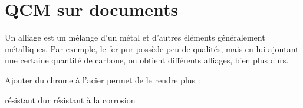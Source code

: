 \section{QCM sur documents}

Un alliage est un mélange d'un métal et d'autres éléments généralement métalliques. Par exemple, le fer pur possède peu de qualités, mais en lui ajoutant une certaine quantité de carbone, on obtient différents alliages, bien plus durs.

\begin{questions}
	\question[] Ajouter du chrome à l'acier permet de le rendre plus :
	\begin{oneparcheckboxes}
		\choice résistant
		\choice dur	
		\correctchoice résistant à la corrosion
		
	\end{oneparcheckboxes} 
	
	\question[] 
	
	
\end{questions}